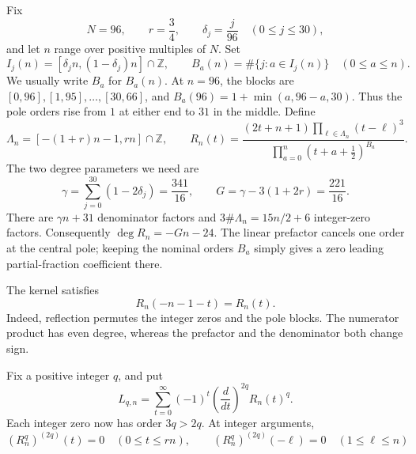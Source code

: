 \documentclass[11pt]{article}
\theoremstyle{remark}
\newcommand{\Z}{\mathbb Z}
\numberwithin{equation}{section}
\begin{document}
Fix
\[
 N=96,\qquad r=\frac34,\qquad \delta_j=\frac{j}{96}
 \quad(0\le j\le30),
\]
and let $n$ range over positive multiples of $N$. Set
\[
 I_j(n)=[\delta_j n,(1-\delta_j)n]\cap\Z,\qquad
 B_a(n)=\#\{j:a\in I_j(n)\}\quad(0\le a\le n).
\]
We usually write $B_a$ for $B_a(n)$. At $n=96$, the blocks are
$[0,96],[1,95],\ldots,[30,66]$, and
$B_a(96)=1+\min(a,96-a,30)$. Thus the pole orders rise from $1$
at either end to $31$ in the middle. Define
\begin{equation}\label{eq:kernel}
 \Lambda_n=[-(1+r)n-1,rn]\cap\Z,\qquad
 R_n(t)=
 \frac{(2t+n+1)\prod_{\ell\in\Lambda_n}(t-\ell)^3}
 {\prod_{a=0}^n(t+a+\tfrac12)^{B_a}}.
\end{equation}
The two degree parameters we need are
\begin{equation}\label{eq:G}
 \gamma=\sum_{j=0}^{30}(1-2\delta_j)=\frac{341}{16},
 \qquad G=\gamma-3(1+2r)=\frac{221}{16}.
\end{equation}
There are $\gamma n+31$ denominator factors and
$3\#\Lambda_n=15n/2+6$ integer-zero factors. Consequently
$\deg R_n=-Gn-24$. The linear prefactor cancels one order at the
central pole; keeping the nominal orders $B_a$ simply gives a zero
leading partial-fraction coefficient there.

The kernel satisfies
\begin{equation}\label{eq:symmetry}
 R_n(-n-1-t)=R_n(t).
\end{equation}
Indeed, reflection permutes the integer zeros and the pole blocks.
The numerator product has even degree, whereas the prefactor and
the denominator both change sign.

Fix a positive integer $q$, and put
\begin{equation}\label{eq:L}
 L_{q,n}=\sum_{t=0}^{\infty}(-1)^t
                  \left(\frac{d}{dt}\right)^{2q}R_n(t)^q.
\end{equation}
Each integer zero now has order $3q>2q$. At integer arguments,
\begin{equation}\label{eq:integerzeros}
 (R_n^q)^{(2q)}(t)=0\quad(0\le t\le rn),\qquad
 (R_n^q)^{(2q)}(-\ell)=0\quad(1\le\ell\le n)
\end{equation}
\end{document}
